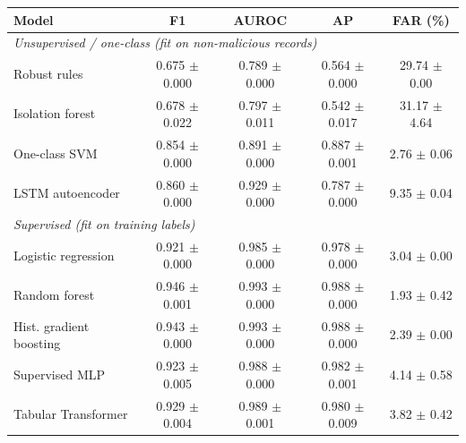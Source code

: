 \begin{tabular}{lcccc}
\toprule
Model & F1 & AUROC & AP & FAR (\%) \\
\midrule
\multicolumn{5}{l}{\textit{Unsupervised / one-class (fit on non-malicious records)}} \\
Robust rules & 0.675 $\pm$ 0.000 & 0.789 $\pm$ 0.000 & 0.564 $\pm$ 0.000 & 29.74 $\pm$ 0.00 \\
Isolation forest & 0.678 $\pm$ 0.022 & 0.797 $\pm$ 0.011 & 0.542 $\pm$ 0.017 & 31.17 $\pm$ 4.64 \\
One-class SVM & 0.854 $\pm$ 0.000 & 0.891 $\pm$ 0.000 & 0.887 $\pm$ 0.001 & 2.76 $\pm$ 0.06 \\
LSTM autoencoder & 0.860 $\pm$ 0.000 & 0.929 $\pm$ 0.000 & 0.787 $\pm$ 0.000 & 9.35 $\pm$ 0.04 \\
\midrule
\multicolumn{5}{l}{\textit{Supervised (fit on training labels)}} \\
Logistic regression & 0.921 $\pm$ 0.000 & 0.985 $\pm$ 0.000 & 0.978 $\pm$ 0.000 & 3.04 $\pm$ 0.00 \\
Random forest & 0.946 $\pm$ 0.001 & 0.993 $\pm$ 0.000 & 0.988 $\pm$ 0.000 & 1.93 $\pm$ 0.42 \\
Hist. gradient boosting & 0.943 $\pm$ 0.000 & 0.993 $\pm$ 0.000 & 0.988 $\pm$ 0.000 & 2.39 $\pm$ 0.00 \\
Supervised MLP & 0.923 $\pm$ 0.005 & 0.988 $\pm$ 0.000 & 0.982 $\pm$ 0.001 & 4.14 $\pm$ 0.58 \\
Tabular Transformer & 0.929 $\pm$ 0.004 & 0.989 $\pm$ 0.001 & 0.980 $\pm$ 0.009 & 3.82 $\pm$ 0.42 \\
\bottomrule
\end{tabular}
